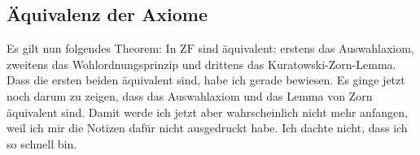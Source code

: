 \begin{math-stroke}
\end{math-stroke}

\subsection{Äquivalenz der Axiome}

\begin{spoken-clean}[01:02:40 - 01:04:40]
Es gilt nun folgendes Theorem: In $\text{ZF}$ sind äquivalent: erstens das Auswahlaxiom, zweitens das Wohlordnungsprinzip und drittens das Kuratowski-Zorn-Lemma. Dass die ersten beiden äquivalent sind, habe ich gerade bewiesen. Es ginge jetzt noch darum zu zeigen, dass das Auswahlaxiom und das Lemma von Zorn äquivalent sind. Damit werde ich jetzt aber wahrscheinlich nicht mehr anfangen, weil ich mir die Notizen dafür nicht ausgedruckt habe. Ich dachte nicht, dass ich so schnell bin.
\end{spoken-clean}

\begin{math-stroke}
\end{math-stroke}

\begin{ai-global-state-checkpoint-invisible-content}
\end{ai-global-state-checkpoint-invisible-content}

